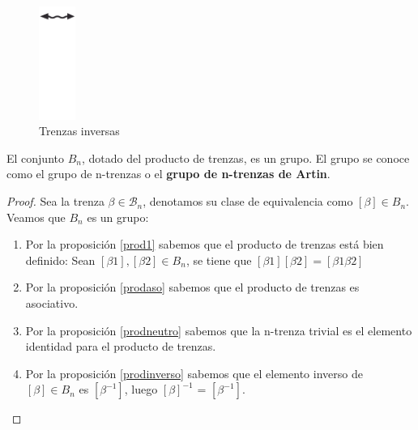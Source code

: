 \begin{figure}[h!]
   	\includegraphics[width=1.2cm]{itrenzas/flechac.png}
   	\caption{Trenzas inversas}
   	\label{grupo4} 
   \end{figure}

\begin{teo}
	El conjunto ${B}_{n}$, dotado del producto de trenzas, es un grupo. El grupo se conoce como el grupo de n-trenzas o el \textbf{grupo de n-trenzas de Artin}. 
	\begin{proof} Sea la trenza $\beta \in \mathscr{B}_{n}$, denotamos su clase de equivalencia como $[\beta] \in {B}_{n}$. Veamos que  ${B}_{n}$ es un grupo: \\
		\begin{enumerate}
			\item 
			Por la proposición \ref{prod1} sabemos que el producto de trenzas está bien definido: Sean $[\beta1],[\beta2] \in {B}_{n}$, se tiene que $[\beta1][\beta2] = [\beta1\beta2] $
			\item 
			Por la proposición \ref{prodaso} sabemos que el producto de trenzas es asociativo.
			\item 
			Por la proposición \ref{prodneutro} sabemos que la n-trenza trivial es el elemento identidad para el producto de trenzas.
			\item 
			Por la proposición \ref{prodinverso} sabemos que el elemento inverso de  $[\beta] \in {B}_{n}$ es $[\beta^{-1}]$, luego  $[\beta]^{-1}$ =  $[\beta^{-1}]$.
		\end{enumerate}
	\end{proof}
\end{teo}

